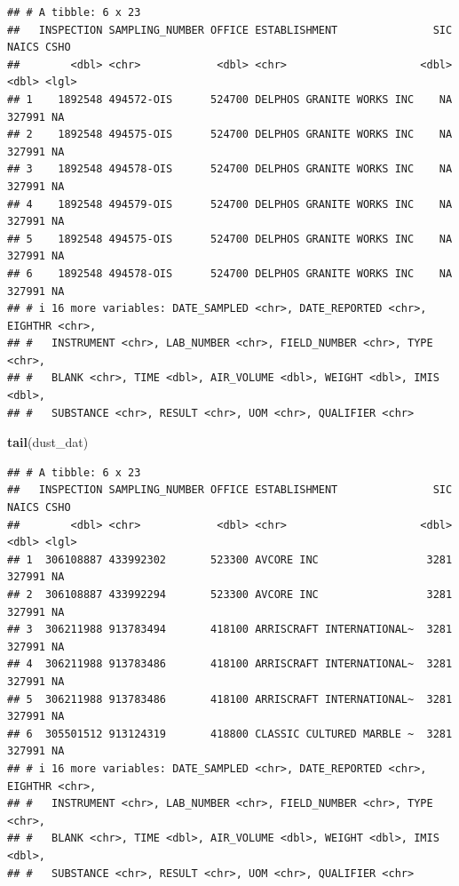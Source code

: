 \documentclass[
]{article}
\newenvironment{Shaded}{\begin{snugshade}}{\end{snugshade}}
\newcommand{\FunctionTok}[1]{\textcolor[rgb]{0.13,0.29,0.53}{\textbf{#1}}}
\newcommand{\NormalTok}[1]{#1}
\begin{document}
\begin{verbatim}
## # A tibble: 6 x 23
##   INSPECTION SAMPLING_NUMBER OFFICE ESTABLISHMENT               SIC  NAICS CSHO 
##        <dbl> <chr>            <dbl> <chr>                     <dbl>  <dbl> <lgl>
## 1    1892548 494572-OIS      524700 DELPHOS GRANITE WORKS INC    NA 327991 NA   
## 2    1892548 494575-OIS      524700 DELPHOS GRANITE WORKS INC    NA 327991 NA   
## 3    1892548 494578-OIS      524700 DELPHOS GRANITE WORKS INC    NA 327991 NA   
## 4    1892548 494579-OIS      524700 DELPHOS GRANITE WORKS INC    NA 327991 NA   
## 5    1892548 494575-OIS      524700 DELPHOS GRANITE WORKS INC    NA 327991 NA   
## 6    1892548 494578-OIS      524700 DELPHOS GRANITE WORKS INC    NA 327991 NA   
## # i 16 more variables: DATE_SAMPLED <chr>, DATE_REPORTED <chr>, EIGHTHR <chr>,
## #   INSTRUMENT <chr>, LAB_NUMBER <chr>, FIELD_NUMBER <chr>, TYPE <chr>,
## #   BLANK <chr>, TIME <dbl>, AIR_VOLUME <dbl>, WEIGHT <dbl>, IMIS <dbl>,
## #   SUBSTANCE <chr>, RESULT <chr>, UOM <chr>, QUALIFIER <chr>
\end{verbatim}

\begin{Shaded}
\begin{Highlighting}[]
\FunctionTok{tail}\NormalTok{(dust\_dat) }
\end{Highlighting}
\end{Shaded}

\begin{verbatim}
## # A tibble: 6 x 23
##   INSPECTION SAMPLING_NUMBER OFFICE ESTABLISHMENT               SIC  NAICS CSHO 
##        <dbl> <chr>            <dbl> <chr>                     <dbl>  <dbl> <lgl>
## 1  306108887 433992302       523300 AVCORE INC                 3281 327991 NA   
## 2  306108887 433992294       523300 AVCORE INC                 3281 327991 NA   
## 3  306211988 913783494       418100 ARRISCRAFT INTERNATIONAL~  3281 327991 NA   
## 4  306211988 913783486       418100 ARRISCRAFT INTERNATIONAL~  3281 327991 NA   
## 5  306211988 913783486       418100 ARRISCRAFT INTERNATIONAL~  3281 327991 NA   
## 6  305501512 913124319       418800 CLASSIC CULTURED MARBLE ~  3281 327991 NA   
## # i 16 more variables: DATE_SAMPLED <chr>, DATE_REPORTED <chr>, EIGHTHR <chr>,
## #   INSTRUMENT <chr>, LAB_NUMBER <chr>, FIELD_NUMBER <chr>, TYPE <chr>,
## #   BLANK <chr>, TIME <dbl>, AIR_VOLUME <dbl>, WEIGHT <dbl>, IMIS <dbl>,
## #   SUBSTANCE <chr>, RESULT <chr>, UOM <chr>, QUALIFIER <chr>
\end{verbatim}
\end{document}
